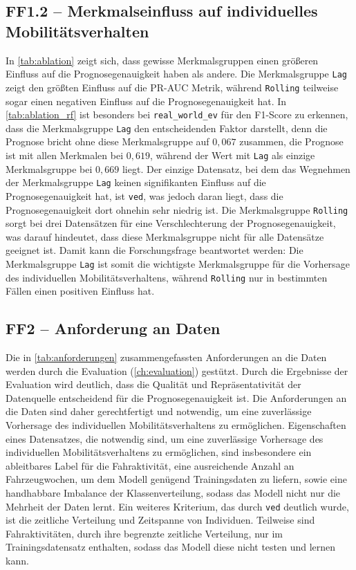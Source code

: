 \subsection{FF1.2 -- Merkmalseinfluss auf individuelles Mobilitätsverhalten}

In \cref{tab:ablation} zeigt sich, dass gewisse Merkmalsgruppen einen größeren Einfluss auf die Prognosegenauigkeit haben als andere. Die Merkmalsgruppe \texttt{Lag} zeigt den größten Einfluss auf die PR-AUC Metrik, während \texttt{Rolling} teilweise sogar einen negativen Einfluss auf die Prognosegenauigkeit hat. In \cref{tab:ablation_rf} ist besonders bei \texttt{real\_world\_ev} für den F1-Score zu erkennen, dass die Merkmalsgruppe \texttt{Lag} den entscheidenden Faktor darstellt, denn die Prognose bricht ohne diese Merkmalsgruppe auf $0,067$ zusammen, die Prognose ist mit allen Merkmalen bei $0,619$, während der Wert mit \texttt{Lag} als einzige Merkmalsgruppe bei $0,669$ liegt. Der einzige Datensatz, bei dem das Wegnehmen der Merkmalsgruppe \texttt{Lag} keinen signifikanten Einfluss auf die Prognosegenauigkeit hat, ist \texttt{ved}, was jedoch daran liegt, dass die Prognosegenauigkeit dort ohnehin sehr niedrig ist. Die Merkmalsgruppe \texttt{Rolling} sorgt bei drei Datensätzen für eine Verschlechterung der Prognosegenauigkeit, was darauf hindeutet, dass diese Merkmalsgruppe nicht für alle Datensätze geeignet ist. Damit kann die Forschungsfrage beantwortet werden: Die Merkmalsgruppe \texttt{Lag} ist somit die wichtigste Merkmalsgruppe für die Vorhersage des individuellen Mobilitätsverhaltens, während \texttt{Rolling} nur in bestimmten Fällen einen positiven Einfluss hat. 

\subsection{FF2 -- Anforderung an Daten}

Die in \cref{tab:anforderungen} zusammengefassten Anforderungen an die Daten werden durch die Evaluation (\cref{ch:evaluation}) gestützt. Durch die Ergebnisse der Evaluation wird deutlich, dass die Qualität und Repräsentativität der Datenquelle entscheidend für die Prognosegenauigkeit ist. Die Anforderungen an die Daten sind daher gerechtfertigt und notwendig, um eine zuverlässige Vorhersage des individuellen Mobilitätsverhaltens zu ermöglichen. Eigenschaften eines Datensatzes, die notwendig sind, um eine zuverlässige Vorhersage des individuellen Mobilitätsverhaltens zu ermöglichen, sind insbesondere ein ableitbares Label für die Fahraktivität, eine ausreichende Anzahl an Fahrzeugwochen, um dem Modell genügend Trainingsdaten zu liefern, sowie eine handhabbare Imbalance der Klassenverteilung, sodass das Modell nicht nur die Mehrheit der Daten lernt. Ein weiteres Kriterium, das durch \texttt{ved} deutlich wurde, ist die zeitliche Verteilung und Zeitspanne von Individuen. Teilweise sind Fahraktivitäten, durch ihre begrenzte zeitliche Verteilung, nur im Trainingsdatensatz enthalten, sodass das Modell diese nicht testen und lernen kann. 

